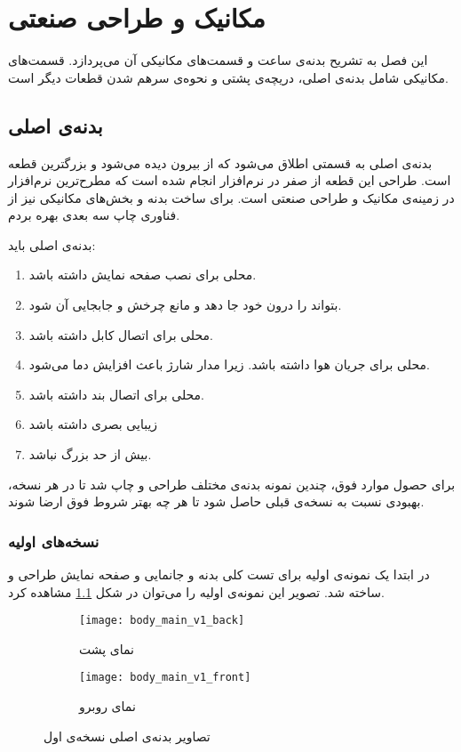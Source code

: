 \chapter{مکانیک و طراحی صنعتی} \label{chap:mechanical}

این فصل به تشریح بدنه‌ی ساعت و قسمت‌های مکانیکی آن می‌پردازد. قسمت‌های مکانیکی شامل بدنه‌ی اصلی، دریچه‌ی پشتی و نحوه‌ی سرهم شدن قطعات دیگر است.
\section{بدنه‌ی اصلی}
بدنه‌ی اصلی به قسمتی اطلاق می‌شود که از بیرون دیده می‌شود و بزرگترین قطعه است. طراحی این قطعه از صفر در نرم‌افزار  انجام شده است که مطرح‌ترین نرم‌افزار در زمینه‌ی مکانیک و طراحی صنعتی است. برای ساخت بدنه و بخش‌های مکانیکی نیز از فناوری چاپ سه بعدی بهره بردم.

بدنه‌ی اصلی باید:
\begin{multicols}{2}
\begin{enumerate}
	\item محلی برای نصب صفحه نمایش داشته باشد.
	\item  بتواند \pcbf را درون خود جا دهد و مانع چرخش و جابجایی آن شود.
	\item محلی برای اتصال کابل  داشته باشد.
	\item محلی برای جریان هوا داشته باشد. زیرا مدار شارژ باعث افزایش دما می‌شود.
	\item محلی برای اتصال بند داشته باشد.
	\item زیبایی بصری داشته باشد
	\item بیش از حد بزرگ نباشد.
\end{enumerate}
\end{multicols}

برای حصول موارد فوق، چندین نمونه بدنه‌ی مختلف طراحی و چاپ شد تا در هر نسخه، بهبودی نسبت به نسخه‌ی قبلی حاصل شود تا هر چه بهتر شروط فوق ارضا شوند.

\subsection{نسخه‌های اولیه}

در ابتدا یک نمونه‌ی اولیه برای تست کلی بدنه و جانمایی \pcbf و صفحه نمایش طراحی و ساخته شد. تصویر این نمونه‌ی اولیه را می‌توان در شکل \ref{fig:body-v1} مشاهده کرد.

\begin{figure}[h]
	\centering
	\begin{subfigure}{0.44\textwidth}
		\centering
		\texttt{[image: body\_main\_v1\_back]}
		\caption{نمای پشت}
	\end{subfigure}
	\begin{subfigure}{0.44\textwidth}
		\centering
		\texttt{[image: body\_main\_v1\_front]}
		\caption{نمای روبرو}
	\end{subfigure}
	\caption{تصاویر بدنه‌ی اصلی نسخه‌ی اول}
	\label{fig:body-v1}
\end{figure}

